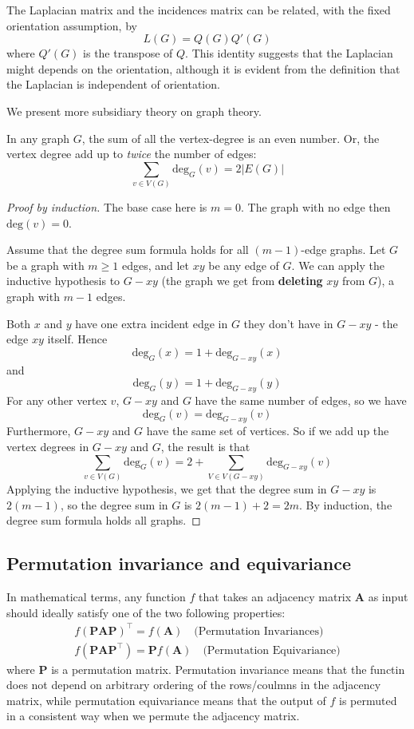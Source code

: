 The Laplacian matrix and the incidences matrix can be related, with the fixed orientation assumption, by \begin{equation}
    L(G) = Q(G)Q'(G)
\end{equation} where $Q'(G)$ is the transpose of $Q$. This identity suggests that the Laplacian might depends on the orientation, although it is evident from the definition that the Laplacian is independent of orientation. 


We present more subsidiary theory on graph theory. 
\begin{theorem}
  In any graph $G$, the sum of all the vertex-degree is an even number. Or, the vertex degree add up to \textit{twice} the number of edges: $$\sum_{v\in V(G)}\mathrm{deg}_{G}(v)= 2\lvert E(G) \rvert $$
\end{theorem}
\begin{proof}[Proof by induction]
  The base case here is $m=0$. The graph with no edge then $\mathrm{deg}(v)=0$. 

Assume that the degree sum formula holds for all $(m-1)$-edge graphs. Let $G$ be a graph with $m\geq 1$ edges, and let $xy$ be any edge of $G$. We can apply the inductive hypothesis to $G-xy$ (the graph we get from \textbf{deleting} $xy$ from $G$), a graph with $m-1$ edges. 

Both $x$ and $y$ have one extra incident edge in $G$ they don't have in $G-xy$ - the edge $xy$ itself. Hence $$\mathrm{deg}_{G}(x)=1+\mathrm{deg}_{G-xy}(x)$$
and $$\mathrm{deg}_{G}(y)=1+\mathrm{deg}_{G-xy}(y)$$
For any other vertex $v$, $G-xy$ and $G$ have the same number of edges, so we have $$\mathrm{deg}_{G}(v)=\mathrm{deg}_{G-xy}(v)$$
Furthermore, $G-xy$ and $G$ have the same set of vertices. So if we add up the vertex degrees in $G-xy$ and $G$, the result is that $$\sum_{v\in V(G)} \mathrm{deg}_{G}(v)= 2+ \sum_{V\in V(G-xy)}\mathrm{deg}_{G-xy}(v)$$
Applying the inductive hypothesis, we get that the degree sum in $G-xy$ is $2(m-1)$, so the degree sum in $G$ is $2(m-1)+2=2m$. By induction, the degree sum formula holds all graphs.  
\end{proof}

\subsection{Permutation invariance and equivariance}

In mathematical terms, any function $f$ that takes an adjacency matrix $\mathbf{A}$ as input should ideally satisfy one of the two following properties: 
\begin{align}
  f(\mathbf{PAP})^{\top}= f(\mathbf{A})\quad \text{(Permutation Invariances)}\\
  f(\mathbf{PAP^{\top}}) = \mathbf{P}f(\mathbf{A})\quad \text{(Permutation Equivariance)}
\end{align}
where $\mathbf{P}$ is a permutation matrix. Permutation invariance means that the functin does not depend on arbitrary ordering of the rows/coulmns in the adjacency matrix, while permutation equivariance means that the output of $f$ is permuted in a consistent way when we permute the adjacency matrix. 

